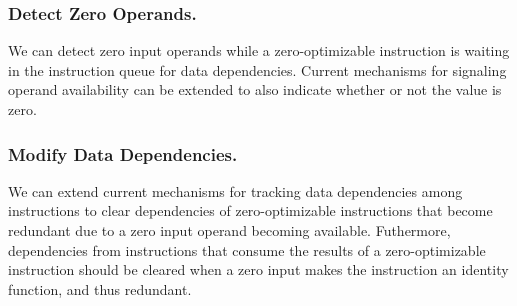 \subsubsection{Detect Zero Operands.} We can detect zero input operands while a zero-optimizable instruction is waiting in the instruction queue for data dependencies.  Current mechanisms for signaling operand availability can be extended to also indicate whether or not the value is zero. 
 
 \subsubsection{Modify Data Dependencies.}  We can extend current mechanisms for tracking data dependencies among instructions to clear dependencies of zero-optimizable instructions that become redundant due to a zero input operand becoming available. Futhermore, dependencies from instructions that consume the results of a zero-optimizable instruction should be cleared when a zero input makes the instruction an identity function, and thus redundant.  
 

 